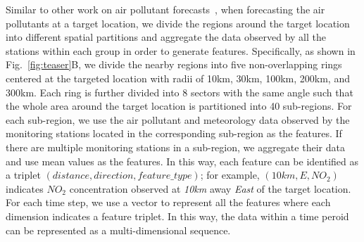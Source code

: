 Similar to other work on air pollutant forecasts~\cite{zheng2015forecasting}, when forecasting the air pollutants at a target location, we divide the regions around the target location into different spatial partitions and aggregate the data observed by all the stations within each group in order to generate features.
Specifically, as shown in Fig.~\ref{fig:teaser}B, we divide the nearby regions into five non-overlapping rings centered at the targeted location with radii of 10km, 30km, 100km, 200km, and 300km.
Each ring is further divided into 8 sectors with the same angle such that the whole area around the target location is partitioned into 40 sub-regions. 
For each sub-region, we use the air pollutant and meteorology data observed by the monitoring stations located in the corresponding sub-region  as the features.
If there are multiple monitoring stations in a sub-region, we aggregate their data and use mean values as the features.
In this way, each feature can be identified as a triplet $(distance, direction, feature\_type)$; for example, $(10km, E, NO_{2})$ indicates $NO_{2}$ concentration observed at \textit{10km} away \textit{East} of the target location. 
For each time step, we use a vector to represent all the features where each dimension indicates a feature triplet.
In this way, the data within a time peroid can be represented as a multi-dimensional sequence. 

